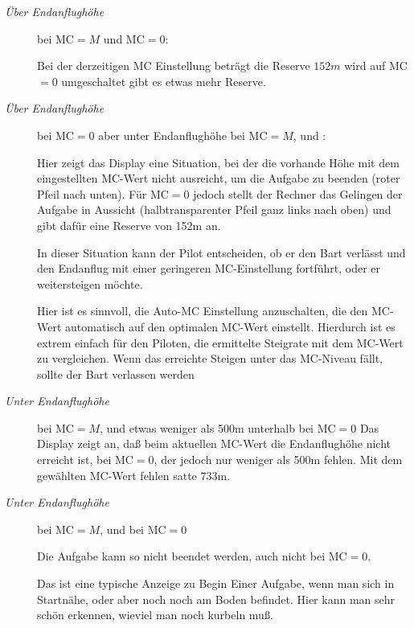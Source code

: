 \begin{description}
\item[\textit{Über Endanflughöhe}] bei  MC$=M$ und MC$=0$:

Bei der derzeitigen MC Einstellung beträgt die Reserve $152m$ wird auf MC$=0$ umgeschaltet gibt es etwas mehr Reserve.


\item[\textit{Über Endanflughöhe}] bei MC$=0$ aber unter Endanflughöhe bei  MC$=M$, und :

Hier zeigt  das Display eine Situation, bei der die vorhande Höhe  mit dem eingestellten MC-Wert nicht ausreicht,
um die Aufgabe zu beenden (roter Pfeil nach unten). Für MC$=0$ jedoch stellt der Rechner das Gelingen
der Aufgabe in Aussicht (halbtransparenter  Pfeil ganz links nach oben) und gibt dafür eine Reserve von 152m an.

In dieser Situation kann der Pilot entscheiden, ob er den Bart verlässt und den Endanflug
mit einer geringeren MC-Einstellung fortführt, oder er weitersteigen möchte.

Hier ist es sinnvoll, die Auto-MC Einstellung anzuschalten, die den MC-Wert automatisch auf den
optimalen MC-Wert einstellt. Hierdurch ist es extrem einfach für den Piloten, die ermittelte Steigrate
mit dem MC-Wert zu vergleichen. Wenn das erreichte Steigen unter das MC-Niveau fällt,
sollte der Bart verlassen werden

\item[\textit{Unter Endanflughöhe}]   bei MC$=M$, und etwas weniger als 500m  unterhalb bei MC$=0$
Das Display zeigt an, daß beim aktuellen MC-Wert die Endanflughöhe nicht erreicht ist,
bei MC$=0$, der jedoch nur weniger als 500m fehlen.
Mit dem gewählten MC-Wert fehlen satte 733m.
\item[\textit{Unter Endanflughöhe}]  bei  MC$=M$, und bei MC$=0$

Die Aufgabe kann so nicht beendet werden, auch nicht bei MC$=0$.

\vspace{2em}
Das ist eine typische Anzeige zu Begin Einer Aufgabe, wenn man sich in Startnähe, oder aber noch noch am Boden befindet.  
Hier kann man sehr schön erkennen, wieviel man noch kurbeln muß.
\end{description}



